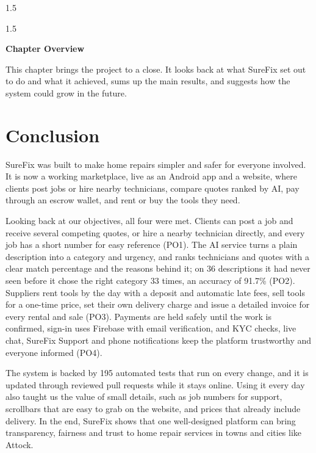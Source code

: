 \documentclass[A4paper,12pt]{report}
\theoremstyle{plain}
\theoremstyle{definition}
\theoremstyle{remark}
\numberwithin{equation}{section}
\begin{document}
\begin{spacing}{1.5}
\begin{spacing}{1.5}
\thispagestyle{empty}

{\centering \Large \bfseries Chapter Overview \par}
\vspace{1cm} %

This chapter brings the project to a close. It looks back at what SureFix set out to do and what it achieved, sums up the main results, and suggests how the system could grow in the future.


\end{spacing}

\section{Conclusion}

SureFix was built to make home repairs simpler and safer for everyone involved. It is now a working marketplace, live as an Android app and a website, where clients post jobs or hire nearby technicians, compare quotes ranked by AI, pay through an escrow wallet, and rent or buy the tools they need.

Looking back at our objectives, all four were met. Clients can post a job and receive several competing quotes, or hire a nearby technician directly, and every job has a short number for easy reference (PO1). The AI service turns a plain description into a category and urgency, and ranks technicians and quotes with a clear match percentage and the reasons behind it; on 36 descriptions it had never seen before it chose the right category 33 times, an accuracy of 91.7\% (PO2). Suppliers rent tools by the day with a deposit and automatic late fees, sell tools for a one-time price, set their own delivery charge and issue a detailed invoice for every rental and sale (PO3). Payments are held safely until the work is confirmed, sign-in uses Firebase with email verification, and KYC checks, live chat, SureFix Support and phone notifications keep the platform trustworthy and everyone informed (PO4).

The system is backed by 195 automated tests that run on every change, and it is updated through reviewed pull requests while it stays online. Using it every day also taught us the value of small details, such as job numbers for support, scrollbars that are easy to grab on the website, and prices that already include delivery. In the end, SureFix shows that one well-designed platform can bring transparency, fairness and trust to home repair services in towns and cities like Attock.


\end{spacing}
\end{document}
